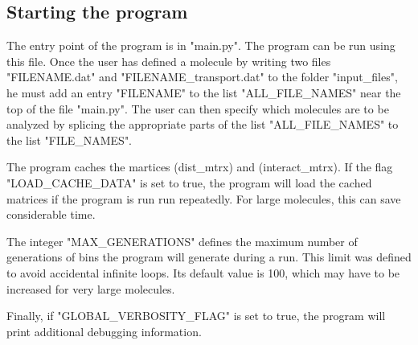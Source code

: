 \documentclass[11pt,a4paper]{article}
\begin{document}
\subsection{Starting the program}

The entry point of the program is in "main.py". The program can be run using this file. Once the user has defined a molecule by writing two files "FILENAME.dat" and "FILENAME\_transport.dat" to the folder "input\_files", he must add an entry "FILENAME" to the list "ALL\_FILE\_NAMES" near the top of the file "main.py". The user can then specify which molecules are to be analyzed by splicing the appropriate parts of the list "ALL\_FILE\_NAMES" to the list "FILE\_NAMES".

The program caches the martices (dist\_mtrx) and (interact\_mtrx). If the flag "LOAD\_CACHE\_DATA" is set to true, the program will load the cached matrices if the program is run run repeatedly. For large molecules, this can save considerable time.

The integer "MAX\_GENERATIONS" defines the maximum number of generations of bins the program will generate during a run. This limit was defined to avoid accidental infinite loops. Its default value is 100, which may have to be increased for very large molecules.

Finally, if "GLOBAL\_VERBOSITY\_FLAG" is set to true, the program will print additional debugging information.




\end{document}
